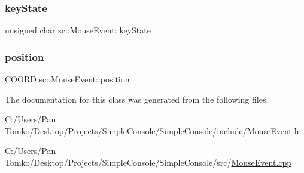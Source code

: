 \subsubsection{\texorpdfstring{keyState}{keyState}}
{\footnotesize\ttfamily unsigned char sc\+::\+Mouse\+Event\+::key\+State}

\mbox{\label{classsc_1_1_mouse_event_ab1b41d159d16878287fdef8f625c8939}} 
\subsubsection{\texorpdfstring{position}{position}}
{\footnotesize\ttfamily C\+O\+O\+RD sc\+::\+Mouse\+Event\+::position}



The documentation for this class was generated from the following files\+:\begin{DoxyCompactItemize}
\item 
C\+:/\+Users/\+Pan Tomko/\+Desktop/\+Projects/\+Simple\+Console/\+Simple\+Console/include/\mbox{\hyperlink{_mouse_event_8h}{Mouse\+Event.\+h}}\item 
C\+:/\+Users/\+Pan Tomko/\+Desktop/\+Projects/\+Simple\+Console/\+Simple\+Console/src/\mbox{\hyperlink{_mouse_event_8cpp}{Mouse\+Event.\+cpp}}\end{DoxyCompactItemize}
